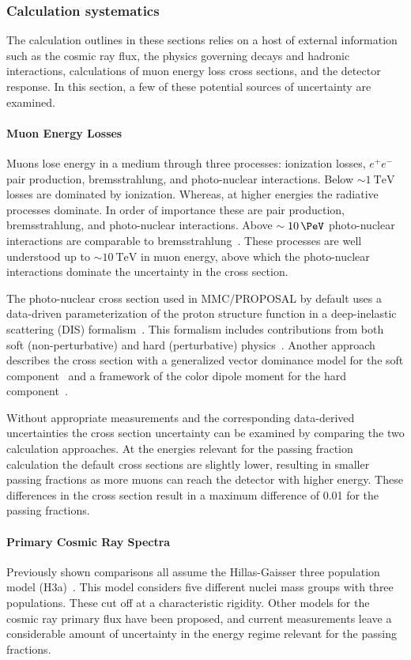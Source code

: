 \subsubsection{Calculation systematics}
The calculation outlines in these sections relies on a host of external information such as the cosmic ray flux, the physics governing decays and hadronic interactions, calculations of muon energy loss cross sections, and the detector response.
In this section, a few of these potential sources of uncertainty are examined.

\paragraph{Muon Energy Losses}
Muons lose energy in a medium through three processes: ionization losses, $e^+e^-$ pair production, bremsstrahlung, and photo-nuclear interactions.
Below $\sim\SI{1}\TeV$ losses are dominated by ionization.
Whereas, at higher energies the radiative processes dominate.
In order of importance these are pair production, bremsstrahlung, and photo-nuclear interactions.
Above $\sim\SI{10}\PeV$ photo-nuclear interactions are comparable to bremsstrahlung~\cite{Chirkin:2004hz}.
These processes are well understood up to $\sim\SI{10}\TeV$ in muon energy, above which the photo-nuclear interactions dominate the uncertainty in the cross section.

The photo-nuclear cross section used in MMC/PROPOSAL by default uses a data-driven parameterization of the proton structure function in a deep-inelastic scattering (DIS) formalism~\cite{Abramowicz:1991xz, Abramowicz:1997ms}.
This formalism includes contributions from both soft (non-perturbative) and hard (perturbative) physics~\cite{Dutta:2000hh}.
Another approach describes the cross section with a generalized vector dominance model for the soft component~\cite{Bezrukov:1981ci} and a framework of the color dipole moment for the hard component~\cite{Bugaev:2002gy, Bugaev:2003sw}.

Without appropriate measurements and the corresponding data-derived uncertainties the cross section uncertainty can be examined by comparing the two calculation approaches.
At the energies relevant for the passing fraction calculation the default cross sections are slightly lower, resulting in smaller passing fractions as more muons can reach the detector with higher energy.
These differences in the cross section result in a maximum difference of 0.01 for the passing fractions.

\paragraph{Primary Cosmic Ray Spectra}
Previously shown comparisons all assume the Hillas-Gaisser three population model (H3a)~\cite{Gaisser:2011cc}.
This model considers five different nuclei mass groups with three populations.
These cut off at a characteristic rigidity.
Other models for the cosmic ray primary flux have been proposed, and current measurements leave a considerable amount of uncertainty in the energy regime relevant for the passing fractions.

